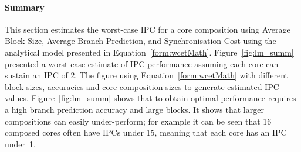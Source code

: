 \paragraph{Summary}

This section estimates the worst-case IPC for a core composition using Average Block Size, Average Branch Prediction, and Synchronisation Cost using the analytical model presented in Equation~\ref{form:wcetMath}.
Figure~\ref{fig:lm_summ} presented a worst-case estimate of IPC performance assuming each core can sustain an IPC of 2.
The figure using Equation~\ref{form:wcetMath} with different block sizes, accuracies and core composition sizes to generate estimated IPC values.
Figure~\ref{fig:lm_summ} shows that to obtain optimal performance requires a high branch prediction accuracy and large blocks.
It shows that larger compositions can easily under-perform; for example it can be seen that 16 composed cores often have IPCs under 15, meaning that each core has an IPC under~1.

